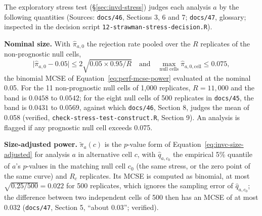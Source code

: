 \documentclass[11pt]{article}
\newcommand{\code}[1]{\texttt{#1}}
\begin{document}
The exploratory stress test (\S\ref{sec:invd-stress}) judges each
analysis $a$ by the following quantities (Sources: \code{docs/46},
Sections 3, 6 and 7; \code{docs/47}, glossary; inspected in the
decision script
\code{12-strawman-\allowbreak stress-\allowbreak decision.R}).

\textbf{Nominal size.} With $\hat\pi_{a,0}$ the rejection rate pooled
over the $R$ replicates of the non-prognostic null cells,
\begin{equation}
\big|\hat\pi_{a,0} - 0.05\big| \le 2\sqrt{0.05 \times 0.95/R}
\quad\text{and}\quad \max_{\text{null cells}} \hat\pi_{a,0,\text{cell}}
  \le 0.075,
\label{eq:invd-nominal}
\end{equation}
the binomial MCSE of Equation~\eqref{eq:perf-mcse-power} evaluated at
the nominal 0.05. For the 11 non-prognostic null cells of 1,000
replicates, $R = 11{,}000$ and the band is $0.0458$ to $0.0542$; for the
eight null cells of 500 replicates in \code{docs/45}, the band is
$0.0431$ to $0.0569$, against which \code{docs/46}, Section 8, judges
the mean of 0.058 (verified, \code{check-stress-test-construct.R}, Section 9). An
analysis is flagged if any prognostic null cell exceeds 0.075.

\textbf{Size-adjusted power.} $\tilde\pi_a(c)$ is the $p$-value form
of Equation~\eqref{eq:invc-size-adjusted} for analysis $a$ in
alternative cell $c$, with $\hat q_{a,c_0}$ the empirical 5\% quantile
of $a$'s $p$-values in the matching null cell $c_0$ (the same stress,
or the zero point of the same curve) and $R_c$ replicates.
Its MCSE is computed as binomial, at most $\sqrt{0.25/500} = 0.022$ for
500 replicates, which ignores the sampling error of $\hat q_{a,c_0}$;
the difference between two independent cells of 500 then has an MCSE of
at most $0.032$ (\code{docs/47}, Section 5, ``about 0.03''; verified).
\end{document}
